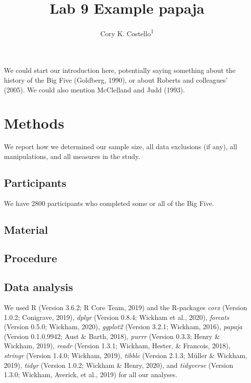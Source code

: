 \documentclass[
  english,
  man]{apa6}
\author{Cory K. Costello\textsuperscript{1}}
\affiliation{
\vspace{0.5cm}
\textsuperscript{1} University of Oregon}
\title{Lab 9 Example papaja}
\date{}
\begin{document}
\maketitle

We could start our introduction here, potentially saying something about the history of the Big Five (Goldberg, 1990), or about Roberts and colleagues' (2005). We could also mention McClelland and Judd (1993).

\hypertarget{methods}{%
\section{Methods}\label{methods}}

We report how we determined our sample size, all data exclusions (if any), all manipulations, and all measures in the study.

\hypertarget{participants}{%
\subsection{Participants}\label{participants}}

We have 2800 participants who completed some or all of the Big Five.

\hypertarget{material}{%
\subsection{Material}\label{material}}

\hypertarget{procedure}{%
\subsection{Procedure}\label{procedure}}

\hypertarget{data-analysis}{%
\subsection{Data analysis}\label{data-analysis}}

We used R (Version 3.6.2; R Core Team, 2019) and the R-packages \emph{corx} (Version 1.0.2; Conigrave, 2019), \emph{dplyr} (Version 0.8.4; Wickham et al., 2020), \emph{forcats} (Version 0.5.0; Wickham, 2020), \emph{ggplot2} (Version 3.2.1; Wickham, 2016), \emph{papaja} (Version 0.1.0.9942; Aust \& Barth, 2018), \emph{purrr} (Version 0.3.3; Henry \& Wickham, 2019), \emph{readr} (Version 1.3.1; Wickham, Hester, \& Francois, 2018), \emph{stringr} (Version 1.4.0; Wickham, 2019), \emph{tibble} (Version 2.1.3; Müller \& Wickham, 2019), \emph{tidyr} (Version 1.0.2; Wickham \& Henry, 2020), and \emph{tidyverse} (Version 1.3.0; Wickham, Averick, et al., 2019) for all our analyses.
\end{document}
